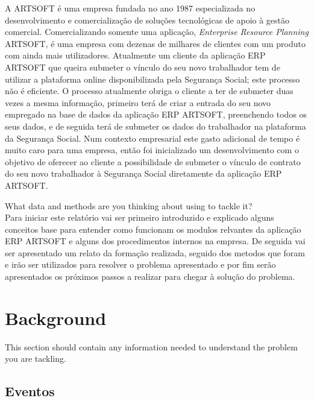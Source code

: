 \documentclass[sigplan]{acmart}
\begin{document}
A ARTSOFT é uma empresa fundada no ano 1987 especializada no desenvolvimento e comercialização de soluções tecnológicas de apoio à gestão comercial. Comercializando somente uma aplicação, \textit{Enterprise Resource Planning} ARTSOFT, é uma empresa com dezenas de milhares de clientes com um produto com ainda mais utilizadores. Atualmente um cliente da aplicação ERP ARTSOFT que queira submeter o vínculo do seu novo trabalhador tem de utilizar a plataforma online disponibilizada pela Segurança Social; este processo não é eficiente. O processo atualmente obriga o cliente a ter de submeter duas vezes a mesma informação, primeiro terá de criar a entrada do seu novo empregado na base de dados da aplicação ERP ARTSOFT, preenchendo todos os seus dados, e de seguida terá de submeter os dados do trabalhador na plataforma da Segurança Social. Num contexto empresarial este gasto adicional de tempo é muito caro para uma empresa, então foi inicializado um desenvolvimento com o objetivo de oferecer ao cliente a possibilidade de submeter o vínculo de contrato do seu novo trabalhador à Segurança Social diretamente da aplicação ERP ARTSOFT.

What data and methods are you thinking about using to tackle it? \\ %

Para iniciar este relatório vai ser primeiro introduzido e explicado alguns conceitos base para entender como funcionam os modulos relvantes da aplicação ERP ARTSOFT e alguns dos procedimentos internos na empresa. De seguida vai ser apresentado um relato da formação realizada, seguido dos metodos que foram e irão ser utilizados para resolver o problema apresentado e por fim serão apresentados os próximos passos a realizar para chegar à solução do problema.

\section{Background} \label{sec:background}

This section should contain any information needed to understand the problem you are tackling.

\subsection{Eventos}
\end{document}
